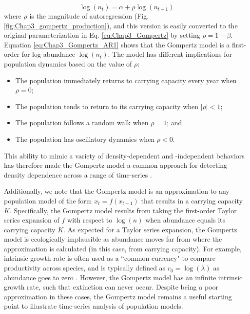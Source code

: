 \begin{equation} \label{eq:Chap3_Gompertz_AR1}
    \log(n_{t}) = \alpha + \rho \log(n_{t-1})
\end{equation}
where \( \rho \) is the magnitude of autoregression (Fig. \ref{fig:Chap3_gompertz_production}), and this version is easily converted to the original parameterization in Eq. \ref{eq:Chap3_Gompertz} by setting \( \rho = 1 - \beta \).  Equation \ref{eq:Chap3_Gompertz_AR1} shows that the Gompertz model is a first-order  for log-abundance \( \log(n_t) \).  The model has different implications for population dynamics based on the value of \(\rho\):
\begin{itemize}
    \item The population immediately returns to carrying capacity every year when \( \rho=0 \);
    
    \item The population tends to return to its carrying capacity when \( |\rho| < 1 \);
    
    \item The population follows a random walk when \( \rho = 1 \); and
    
    \item The population has oscillatory dynamics when \( \rho<0 \). 
\end{itemize}
This ability to mimic a variety of density-dependent and -independent behaviors has therefore made the Gompertz model a common approach for detecting density dependence across a range of time-series \cite{knape_are_2012}.  

Additionally, we note that the Gompertz model is an approximation to any population model of the form \( x_t = f(x_{t-1}) \) that results in a carrying capacity \(K\).  Specifically, the Gompertz model results from taking the first-order Taylor series expansion of \(f\) with respect to \( \log(n) \) when abundance equals its carrying capacity \(K\).  As expected for a Taylor series expansion, the Gompertz model is ecologically implausible as abundance moves far from where the approximation is calculated (in this case, from carrying capacity).  For example, intrinsic growth rate is often used as a ``common currency" to compare productivity across species, and is typically defined as \(r_0 = \log(\lambda)\) as abundance goes to zero \cite{chesson_mechanisms_2000}.  However, the Gompertz model has an infinite intrinsic growth rate, such that extinction can never occur.  Despite being a poor approximation in these cases, the Gompertz model remains a useful starting point to illustrate time-series analysis of population models.  

